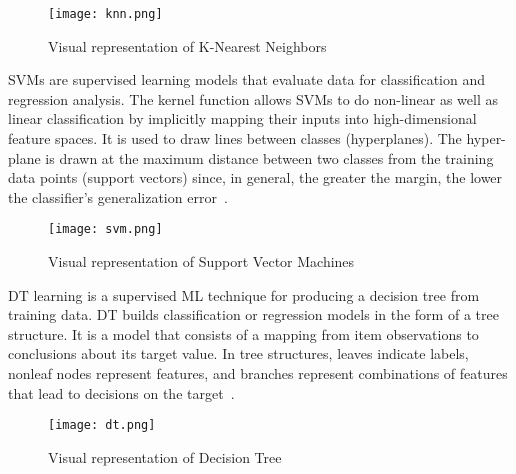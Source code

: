 \begin{figure}[htbp]
    \centering
    \texttt{[image: knn.png]}
    \caption{Visual representation of K-Nearest Neighbors~\cite{Bronshtein2017AMedium}}
    \label{fig:knn}
\end{figure}

\gls{SVM}s are supervised learning models that evaluate data for classification and regression analysis. The kernel function allows \gls{SVM}s to do non-linear as well as linear classification by implicitly mapping their inputs into high-dimensional feature spaces. It is used to draw lines between classes (hyperplanes). The hyper-plane is drawn at the maximum distance between two classes from the training data points (support vectors) since, in general, the greater the margin, the lower the classifier's generalization error~\cite{Mahesh2019MachineReview}.
    
\begin{figure}[htbp]
    \centering
    \texttt{[image: svm.png]}
    \caption{Visual representation of Support Vector Machines~\cite{MaquinaExplicada}}
    \label{fig:svm}
\end{figure}

\gls{DT} learning is a supervised \gls{ML} technique for producing a decision tree from training data. \gls{DT} builds classification or regression models in the form of a tree structure. It is a model that consists of a mapping from item observations to conclusions about its target value. In tree structures, leaves indicate labels, nonleaf nodes represent features, and branches represent combinations of features that lead to decisions on the target~\cite{Tan2015CodeQuality}.

\begin{figure}[htbp]
    \centering
    \texttt{[image: dt.png]}
    \caption{Visual representation of Decision Tree~\cite{Rai2018XGBoostScience}}
    \label{fig:dt}
\end{figure}

